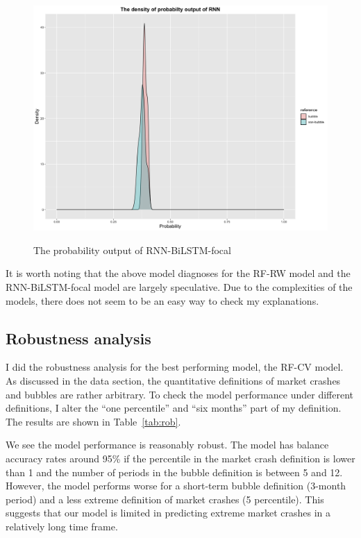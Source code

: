 \documentclass[12pt, man, a4paper, floatsintext]{apa7}
\begin{document}
\begin{figure}
    \centering
    \caption{The probability output of RNN-BiLSTM-focal}
    \includegraphics[width=15cm]{rnn.png}
    \label{fig:rnn}
\end{figure}


It is worth noting that the above model diagnoses for the RF-RW model and the RNN-BiLSTM-focal model are largely speculative. Due to the complexities of the models, there does not seem to be an easy way to check my explanations.

\subsection{Robustness analysis}

I did the robustness analysis for the best performing model, the RF-CV model. As discussed in the data section, the quantitative definitions of market crashes and bubbles are rather arbitrary. To check the model performance under different definitions, I alter the “one percentile” and “six months” part of my definition. The results are shown in Table~\ref{tab:rob}.



We see the model performance is reasonably robust. The model has balance accuracy rates around 95\% if the percentile in the market crash definition is lower than 1 and the number of periods in the bubble definition is between 5 and 12. However, the model performs worse for a short-term bubble definition (3-month period) and a less extreme definition of market crashes (5 percentile). This suggests that our model is limited in predicting extreme market crashes in a relatively long time frame. 
\end{document}
